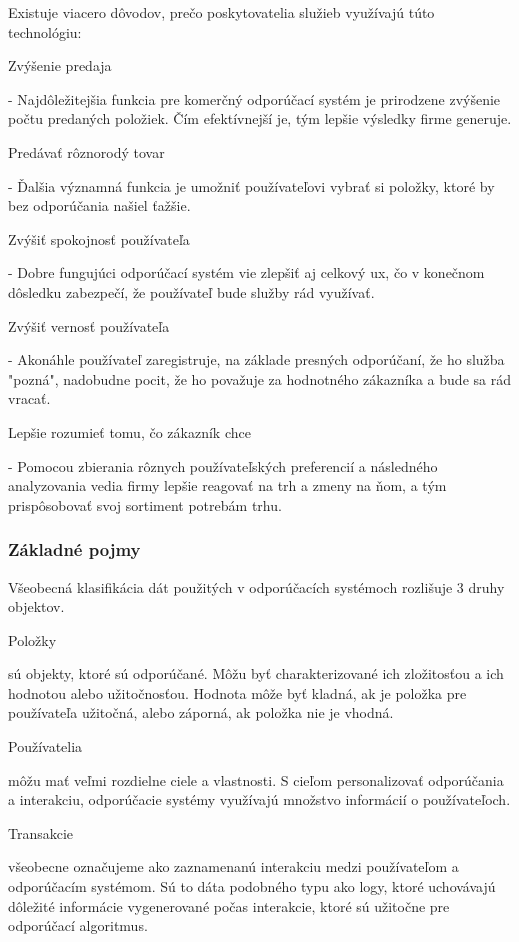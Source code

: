 Existuje viacero dôvodov, prečo poskytovatelia služieb využívajú túto technológiu: 
 \begin{itemize}[leftmargin=*]
{\bf \item Zvýšenie predaja} - Najdôležitejšia funkcia pre komerčný odporúčací systém je prirodzene zvýšenie počtu predaných položiek. Čím efektívnejší je, tým lepšie výsledky firme generuje. 

{\bf \item Predávať rôznorodý tovar} - Ďalšia významná funkcia je umožniť používateľovi vybrať si položky, ktoré by bez odporúčania našiel ťažšie. 
 
{\bf \item Zvýšiť spokojnosť používateľa} - Dobre fungujúci odporúčací systém vie zlepšiť aj celkový \acrshort{ux}, čo v konečnom dôsledku zabezpečí, že používateľ bude služby rád využívať. 

{\bf \item Zvýšiť vernosť používateľa} - Akonáhle používateľ zaregistruje, na základe presných odporúčaní, že ho služba "pozná", nadobudne pocit, že ho považuje za hodnotného zákazníka a bude sa rád vracať.
	
{\bf \item Lepšie rozumieť tomu, čo zákazník chce} - Pomocou zbierania rôznych používateľských preferencií a následného analyzovania vedia firmy lepšie reagovať na trh a zmeny na ňom, a tým prispôsobovať svoj sortiment potrebám trhu. \cite{rs1} \newline

\end{itemize} 


\subsubsection{Základné pojmy}
Všeobecná klasifikácia dát použitých v odporúčacích systémoch rozlišuje 3 druhy objektov.
 \begin{itemize}[leftmargin=*]
{\bf \item Položky} sú objekty, ktoré sú odporúčané. Môžu byť charakterizované ich zložitosťou a ich hodnotou alebo užitočnosťou. Hodnota môže byť kladná, ak je položka pre používateľa užitočná, alebo záporná, ak položka nie je vhodná. 
{\bf \item Používatelia} môžu mať veľmi rozdielne ciele a vlastnosti. S cieľom personalizovať odporúčania a interakciu, odporúčacie systémy využívajú množstvo informácií o používateľoch.
{\bf \item Transakcie} všeobecne označujeme ako zaznamenanú interakciu medzi používateľom a odporúčacím systémom. Sú to dáta podobného typu ako logy, ktoré uchovávajú dôležité informácie vygenerované počas interakcie, ktoré sú užitočne pre odporúčací algoritmus. \cite{rs1}
\end{itemize} 


